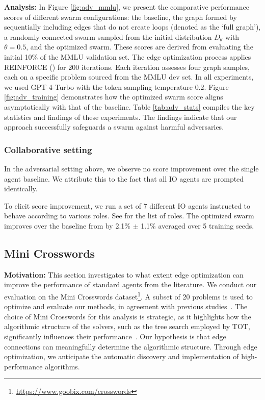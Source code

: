 \documentclass{article}
\theoremstyle{plain}
\theoremstyle{definition}
\theoremstyle{remark}
\begin{document}
\noindent \textbf{Analysis:}
In Figure \ref{fig:adv_mmlu}, we present the comparative performance scores of different swarm configurations: the baseline, the graph formed by sequentially including edges that do not create loops (denoted as the `full graph'), a randomly connected swarm sampled from the initial distribution $D_{\theta}$ with $\theta=0.5$, and the optimized swarm.
These scores are derived from evaluating the initial 10\% of the MMLU validation set.
The edge optimization process applies REINFORCE () for 200 iterations.
Each iteration assesses four graph samples, each on a specific problem sourced from the MMLU dev set.
In all experiments, we used GPT-4-Turbo with the token sampling temperature $0.2$.
Figure \ref{fig:adv_training} demonstrates how the optimized swarm score aligns asymptotically with that of the baseline.
Table \ref{tab:adv_stats} compiles the key statistics and findings of these experiments. 
The findings indicate that our approach successfully safeguards a swarm against harmful adversaries.

\subsubsection{Collaborative setting}
\label{sec:collaborative}

In the adversarial setting above, we observe no score improvement over the single agent baseline.
We attribute this to the fact that all IO agents are prompted identically.

To elicit score improvement, we run a set of 7 different IO agents instructed to behave according to various roles.
See  for the list of roles.
The optimized swarm improves over the baseline from  by 2.1\% $\pm$ 1.1\% averaged over 5 training seeds.

\subsection{Mini Crosswords}
\label{sec:crosswords}
\noindent \textbf{Motivation:}
This section investigates to what extent edge optimization can improve the performance of standard agents from the literature.
We conduct our evaluation on the Mini Crosswords dataset\footnote{\url{https://www.goobix.com/crosswords}}. A subset of 20 problems is used to optimize and evaluate our methods, in agreement with previous studies~\citep{yao2023tree, sel2023algorithm}.
The choice of Mini Crosswords for this analysis is strategic, as it highlights how the algorithmic structure of the solvers, such as the tree search employed by TOT, significantly influences their performance~\citep{yao2023tree}.
Our hypothesis is that edge connections can meaningfully determine the algorithmic structure.
Through edge optimization, we anticipate the automatic discovery and implementation of high-performance algorithms.
\end{document}
